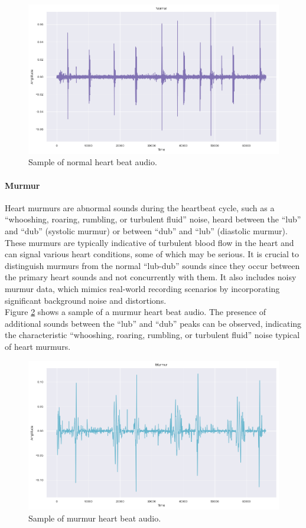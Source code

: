 \begin{figure}[H]
    \centering
    \includegraphics[width=.9\columnwidth]{../images/normal_heart_beat_audio.png}
    \caption{Sample of normal heart beat audio.}
    \label{fig:normal_heart_beat_audio}
\end{figure}

\paragraph{Murmur}
Heart murmurs are abnormal sounds during the heartbeat cycle, such as a ``whooshing, roaring, rumbling, or turbulent fluid'' noise, heard between
the ``lub'' and ``dub'' (systolic murmur) or between ``dub'' and ``lub'' (diastolic murmur).
These murmurs are typically indicative of turbulent blood flow in the heart and can signal various heart conditions, some of which may be serious.
It is crucial to distinguish murmurs from the normal ``lub-dub'' sounds since they occur between the primary heart sounds and not concurrently with them.
It also includes noisy murmur data, which mimics real-world recording scenarios by incorporating significant background noise and distortions.\\
Figure \ref{fig:murmur_heart_beat_audio} shows a sample of a murmur heart beat audio.
The presence of additional sounds between the ``lub'' and ``dub'' peaks can be observed, indicating the characteristic
``whooshing, roaring, rumbling, or turbulent fluid'' noise typical of heart murmurs.

\begin{figure}[H]
    \centering
    \includegraphics[width=.9\columnwidth]{../images/murmur_heart_beat_audio.png}
    \caption{Sample of murmur heart beat audio.}
    \label{fig:murmur_heart_beat_audio}
\end{figure}

